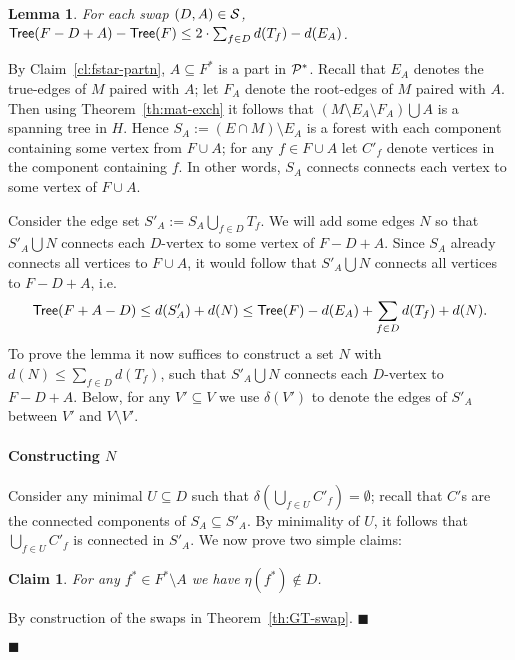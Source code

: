 \documentclass[11pt,twoside,a4paper]{article}
\newtheorem{lemma}[theorem]{Lemma}
\newtheorem{claim}[theorem]{Claim}
\newenvironment{proof}{

\noindent{\bf Proof:}} {\hfill$\blacksquare$


}
\newcommand{\sse}{\subseteq}
\begin{document}
\begin{lemma}\label{lem:kmf-main}
For each swap $(D,A)\in \mathcal{S}$, ${\sf Tree}(F-D+A)-{\sf Tree}(F)\le 2\cdot \sum_{f\in D} d(T_f) - d(E_A)$.
\end{lemma}
\begin{proof}
By Claim~\ref{cl:fstar-partn}, $A\sse F^*$ is a part in $\mathcal{P}^*$. Recall that $E_A$ denotes the true-edges of $M$ paired
with $A$; let $F_A$ denote the root-edges of $M$ paired with $A$. Then using Theorem~\ref{th:mat-exch} it follows that
$(M\setminus E_A \setminus F_A)\bigcup A$ is a spanning tree in $H$. Hence $S_A := (E\cap M) \setminus E_A$ is a forest
with each component containing some vertex from $F\cup A$; for any $f\in F\cup A$ let $C'_f$ denote vertices in the
component containing $f$.
In other words, $S_A$ connects connects each vertex to some vertex of $F\cup A$.



Consider the edge set $S'_A := S_A \bigcup_{f\in D} T_f$. We will add some edges $N$ so that $S'_A\bigcup N$ connects
each $D$-vertex to some vertex of $F-D+A$. Since $S_A$ already connects all vertices to $F\cup A$, it would follow that
$S'_A\bigcup N$ connects all vertices to $F-D+A$, i.e.
$${\sf Tree}(F+A-D)\le d(S'_A) + d(N) \le {\sf Tree}(F) - d(E_A) +\sum_{f\in D} d(T_f)+ d(N).$$
To prove the lemma it now suffices to construct a set $N$ with $d(N)\le \sum_{f\in D} d(T_f)$, such that $S'_A\bigcup
N$ connects each $D$-vertex to $F-D+A$. Below, for any $V'\sse V$ we use $\delta(V')$ to denote the edges of $S'_A$
between $V'$ and $V\setminus V'$.

\paragraph{Constructing $N$} Consider any minimal $U\sse D$ such that $\delta\left(\bigcup_{f\in U} C'_f\right)=\emptyset$; recall that $C'$s are
the connected components of $S_A\sse S'_A$. By minimality of $U$, it follows that $\bigcup_{f\in U} C'_f$ is connected
in $S'_A$. We now prove two simple claims:



\begin{claim}\label{cl:tree-loc2} For any $f^*\in F^*\setminus A$ we have $\eta(f^*)\not\in D$.
\end{claim}
\begin{proof} By construction of the swaps \swap in Theorem~\ref{th:GT-swap}.
\end{proof}


\end{proof}
\end{document}
